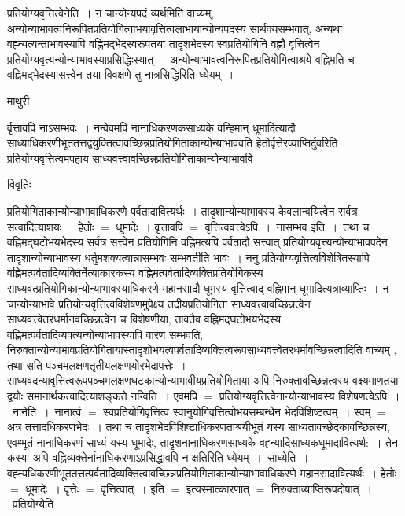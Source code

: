 \documentclass[10pt, openany]{book}
\begin{document}
{प्रतियोग्यवृत्तित्वेनेति~। न चान्योन्यपदं व्यर्थमिति वाच्यम्, अन्योन्याभावत्वनिरूपितप्रतियोगित्वाभयावृत्तित्वलाभायान्योन्यपदस्य सार्थक्यसम्भवात्, अन्यथा वह्न्यत्यन्ताभावस्यापि वह्निमद्भेदस्वरूपतया तादृशभेदस्य स्वप्रतियोगिनि वह्नौ वृत्तित्वेन प्रतियोग्यवृत्यन्योन्याभावस्याप्रसिद्धिःस्यात्~। अन्योन्याभावत्वनिरूपितप्रतियोगित्वाश्रये वह्निमति च वह्निमद्भेदस्यासत्त्वेन तया विवक्षणे तु नात्रसिद्धिरिति ध्येयम्~।
\newpage
 \begin{center}  माथुरी  \end{center} 
{\la र्वृत्तावपि नाऽसम्भवः~। नन्वेवमपि नानाधिकरणकसाध्यके वन्हिमान् धूमादित्यादौ साध्याधिकरणीभूततत्तद्वयुक्तित्वावच्छिन्नप्रतियोगिताकान्योन्याभाववति हेतोर्वृत्तेरव्याप्तिर्दुर्वारेति प्रतियोग्यवृत्तित्वमपहाय साध्यवत्त्वावच्छिन्नप्रतियोगिताकान्योन्याभाववि}
\begin{center}     विवृतिः \end{center}
प्रतियोगिताकान्योन्याभावाधिकरणे पर्वतादावित्यर्थः~। तादृशान्योन्याभावस्य केवलान्वयित्वेन सर्वत्र सत्वादित्याशयः~। हेतोः $=$ धूमादेः~। वृत्तावपि $=$ वृत्तित्ववत्त्वेऽपि~।~{\la नासम्भव इति~।}~तथा च वह्निमद्घटोभयभेदस्य सर्वत्र सत्त्वेन प्रतियोगिनि वह्निमत्यपि पर्वतादौ सत्त्वात् प्रतियोग्यवृत्त्यन्योन्याभावपदेन तादृशान्योन्याभावस्य धर्तुमशक्यत्वान्नासम्भवः सम्भवतीति भावः~। ननु प्रतियोग्यवृत्तित्वविशेषितस्यापि वह्निमत्पर्वतादिव्यक्तिर्नेत्याकारकस्य वह्निमत्पर्वतादिव्यक्तिप्रतियोगिकस्य साध्यवत्प्रतियोगिकान्योन्याभावस्याधिकरणे महानसादौ धूमस्य वृत्तित्वाद् वह्निमान् धूमादित्यत्राव्याप्तिः~। न चान्योन्याभावे प्रतियोग्यवृत्तित्वविशेषणमुपेक्ष्य तदीयप्रतियोगिता
साध्यवत्त्वावच्छिन्नत्वेन साध्यवत्त्वेतरधर्मानवच्छिन्नत्वेन च विशेषणीया, तावतैव वह्निमद्घटोभयभेदस्य वह्निमत्पर्वतादिव्यक्त्यन्योन्याभावस्यापि वारण सम्भवति, निरुक्तान्योन्याभावप्रतियोगितायास्तादृशोभयत्वपर्वतादिव्यक्तित्वरूपसाध्यवत्त्वेतरधर्मावच्छिन्नत्वादिति वाच्यम् , तथा सति पञ्चमलक्षणतृतीयलक्षणयोरभेदापत्तेः~। साध्यवदन्यावृत्तित्वरूपपञ्चमलक्षणघटकान्योन्याभावीयप्रतियोगिताया अपि निरुक्तावच्छिन्नत्वस्य वक्ष्यमाणतया द्वयोः समानार्थकत्वादित्याशङ्कते {\la नन्विति~।} एवमपि $=$ प्रतियोग्यवृत्तित्वेनान्योन्याभावस्य विशेषणत्वेऽपि~।~{\la नानेति~।}~नानात्वं $=$ स्वप्रतियोगिवृत्तित्व स्वानुयोगिवृत्तित्वोभयसम्बन्धेन भेदविशिष्टत्वम्~। स्वम् $=$ अत्र तत्तादधिकरणभेदः~। तथा च तादृशभेदविशिष्टाधिकरणताश्रयीभूतं यस्य
साध्यतावच्छेदकावच्छिन्नस्य, एवम्भूतं नानाधिकरणं साध्यं यस्य धूमादेः, तादृशनानाधिकरणसाध्यके वह्न्यादिसाध्यकधूमादावित्यर्थ:~। तेन कस्या अपि
वह्निव्यक्तेर्नानाधिकरणाऽप्रसिद्धावपि न क्षतिरिति ध्येयम्~।~{\la साध्येति~।} वह्न्यधिकरणीभूततत्तत्पर्वतादिव्यक्तित्वावच्छिन्नप्रतियोगिताकान्योन्याभावाधिकरणे
महानसादावित्यर्थः~। हेतोः $=$ धूमादेः~। वृत्तेः $=$ वृत्तित्वात्~। इति $=$ इत्यस्मात्कारणात् $=$ निरुक्ताव्याप्तिरूपदोषात्~।~{\la प्रतियोग्येति~।}
}
\end{document}
